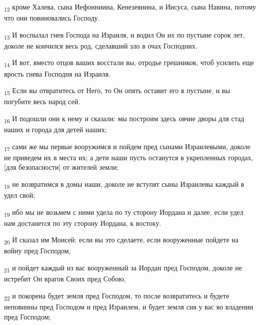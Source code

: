\begin{tcolorbox}
\textsubscript{12} кроме Халева, сына Иефонниина, Кенезеянина, и Иисуса, сына Навина, потому что они повиновались Господу.
\end{tcolorbox}
\begin{tcolorbox}
\textsubscript{13} И воспылал гнев Господа на Израиля, и водил Он их по пустыне сорок лет, доколе не кончился весь род, сделавший зло в очах Господних.
\end{tcolorbox}
\begin{tcolorbox}
\textsubscript{14} И вот, вместо отцов ваших восстали вы, отродье грешников, чтоб усилить еще ярость гнева Господня на Израиля.
\end{tcolorbox}
\begin{tcolorbox}
\textsubscript{15} Если вы отвратитесь от Него, то Он опять оставит его в пустыне, и вы погубите весь народ сей.
\end{tcolorbox}
\begin{tcolorbox}
\textsubscript{16} И подошли они к нему и сказали: мы построим здесь овчие дворы для стад наших и города для детей наших;
\end{tcolorbox}
\begin{tcolorbox}
\textsubscript{17} сами же мы первые вооружимся и пойдем пред сынами Израилевыми, доколе не приведем их в места их; а дети наши пусть останутся в укрепленных городах, [для безопасности] от жителей земли;
\end{tcolorbox}
\begin{tcolorbox}
\textsubscript{18} не возвратимся в домы наши, доколе не вступят сыны Израилевы каждый в удел свой;
\end{tcolorbox}
\begin{tcolorbox}
\textsubscript{19} ибо мы не возьмем с ними удела по ту сторону Иордана и далее, если удел нам достанется по эту сторону Иордана, к востоку.
\end{tcolorbox}
\begin{tcolorbox}
\textsubscript{20} И сказал им Моисей: если вы это сделаете, если вооруженные пойдете на войну пред Господом,
\end{tcolorbox}
\begin{tcolorbox}
\textsubscript{21} и пойдет каждый из вас вооруженный за Иордан пред Господом, доколе не истребит Он врагов Своих пред Собою,
\end{tcolorbox}
\begin{tcolorbox}
\textsubscript{22} и покорена будет земля пред Господом, то после возвратитесь и будете неповинны пред Господом и пред Израилем, и будет земля сия у вас во владении пред Господом;
\end{tcolorbox}
